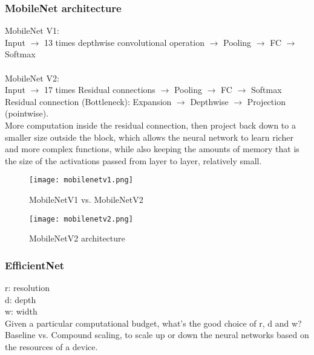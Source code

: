 \subsubsection{MobileNet architecture}
MobileNet V1:\\
Input $\rightarrow$ 13 times depthwise convolutional operation  $\rightarrow$ Pooling  $\rightarrow$ FC  $\rightarrow$ Softmax\\
\\
MobileNet V2:\\
Input $\rightarrow$ 17 times Residual connections $\rightarrow$ Pooling  $\rightarrow$ FC  $\rightarrow$ Softmax\\
Residual connection (Bottleneck): Expansion $\rightarrow$ Depthwise $\rightarrow$ Projection (pointwise).\\
More computation inside the residual connection, then project back down to a smaller size outside the block, which allows the neural network to learn richer and more complex functions, while also keeping the amounts of memory that is the size of the activations passed from layer to layer, relatively small.
\begin{figure}[h]
    \centering
    \texttt{[image: mobilenetv1.png]}
    \caption{MobileNetV1 vs. MobileNetV2}
    \label{fig:mobilenetv1}
\end{figure}
\begin{figure}[h]
    \centering
    \texttt{[image: mobilenetv2.png]}
    \caption{MobileNetV2 architecture}
    \label{fig:mobilenetv2}
\end{figure}

\subsubsection{EfficientNet}
r: resolution\\
d: depth\\
w: width\\
Given a particular computational budget, what's the good choice of r, d and w?\\
Baseline vs. Compound scaling, to scale up or down the neural networks based on the resources of a device.\\

%
